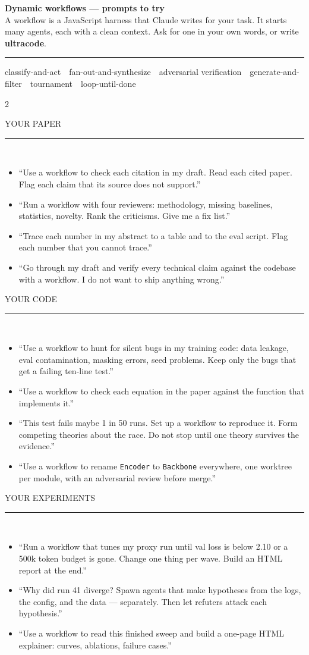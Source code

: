 \documentclass[10pt]{article}
\newcommand{\cat}[1]{%
  \vspace{6pt}%
  {\color{olive}\footnotesize\ttfamily\MakeUppercase{#1}}\\[-9pt]
  {\color{grayline}\rule{\linewidth}{0.8pt}}\\[1pt]}
\newenvironment{prompts}
  {\begin{itemize}[leftmargin=9pt,itemsep=4pt,parsep=0pt,topsep=2pt,label={\color{clay}\small\textbullet}]\small}
  {\end{itemize}}
\newcommand{\p}[1]{\item ``#1''}
\begin{document}
{\LARGE\bfseries\color{slate} Dynamic workflows --- prompts to try}\\[2pt]
{\color{graymid}\small A workflow is a JavaScript harness that Claude writes for your task. It starts many agents, each with a clean context. Ask for one in your own words, or write \textbf{ultracode}.}\\[-4pt]

{\color{grayline}\rule{\linewidth}{1.2pt}}

\vspace{2pt}
{\scriptsize\color{graymid}\ttfamily classify-and-act \,\textperiodcentered\, fan-out-and-synthesize \,\textperiodcentered\, adversarial verification \,\textperiodcentered\, generate-and-filter \,\textperiodcentered\, tournament \,\textperiodcentered\, loop-until-done}

\begin{multicols}{2}

\cat{Your paper}
\begin{prompts}
\p{Use a workflow to check each citation in my draft. Read each cited paper. Flag each claim that its source does not support.}
\p{Run a workflow with four reviewers: methodology, missing baselines, statistics, novelty. Rank the criticisms. Give me a fix list.}
\p{Trace each number in my abstract to a table and to the eval script. Flag each number that you cannot trace.}
\p{Go through my draft and verify every technical claim against the codebase with a workflow. I do not want to ship anything wrong.}
\end{prompts}

\cat{Your code}
\begin{prompts}
\p{Use a workflow to hunt for silent bugs in my training code: data leakage, eval contamination, masking errors, seed problems. Keep only the bugs that get a failing ten-line test.}
\p{Use a workflow to check each equation in the paper against the function that implements it.}
\p{This test fails maybe 1 in 50 runs. Set up a workflow to reproduce it. Form competing theories about the race. Do not stop until one theory survives the evidence.}
\p{Use a workflow to rename \texttt{Encoder} to \texttt{Backbone} everywhere, one worktree per module, with an adversarial review before merge.}
\end{prompts}

\cat{Your experiments}
\begin{prompts}
\p{Run a workflow that tunes my proxy run until val loss is below 2.10 or a 500k token budget is gone. Change one thing per wave. Build an HTML report at the end.}
\p{Why did run 41 diverge? Spawn agents that make hypotheses from the logs, the config, and the data --- separately. Then let refuters attack each hypothesis.}
\p{Use a workflow to read this finished sweep and build a one-page HTML explainer: curves, ablations, failure cases.}
\end{prompts}


\end{multicols}
\end{document}
